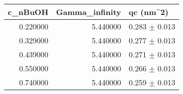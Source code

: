 \begin{tabular}{rrl}
\toprule
c_nBuOH & Gamma_infinity & qc (nm^2) \\
\midrule
0.220000 & 5.440000 & 0.283 $\pm$ 0.013 \\
0.329000 & 5.440000 & 0.277 $\pm$ 0.013 \\
0.439000 & 5.440000 & 0.271 $\pm$ 0.013 \\
0.550000 & 5.440000 & 0.266 $\pm$ 0.013 \\
0.740000 & 5.440000 & 0.259 $\pm$ 0.013 \\
\bottomrule
\end{tabular}
